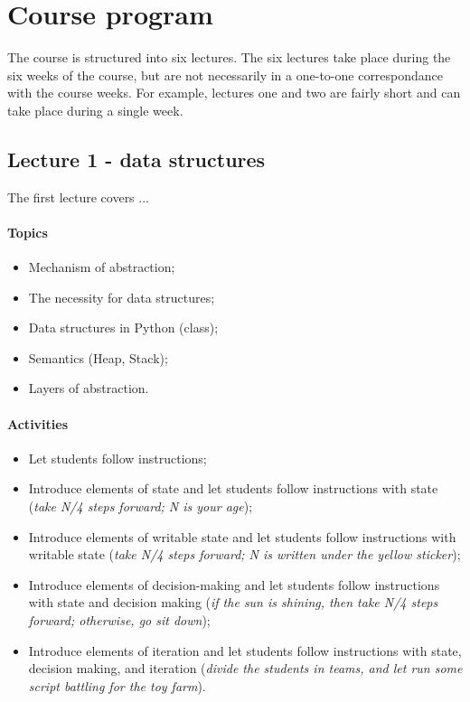 \section{Course program}
	The course is structured into six lectures. The six lectures take place during the six weeks of the course, but are not necessarily in a one-to-one correspondance with the course weeks. For example, lectures one and two are fairly short and can take place during a single week.

	\subsection{Lecture 1 - data structures}
		The first lecture covers ...

		\paragraph*{Topics}
			\begin{itemize}
				\item Mechanism of abstraction;
				\item The necessity for data structures;
				\item Data structures in Python (class);
				\item Semantics (Heap, Stack);
				\item Layers of abstraction.
			\end{itemize}

		\paragraph*{Activities}
			\begin{itemize}
				\item Let students follow instructions;
				\item Introduce elements of state and let students follow instructions with state (\textit{take N/4 steps forward; N is your age});
				\item Introduce elements of writable state and let students follow instructions with writable state (\textit{take N/4 steps forward; N is written under the yellow sticker});
				\item Introduce elements of decision-making and let students follow instructions with state and decision making (\textit{if the sun is shining, then take N/4 steps forward; otherwise, go sit down});
				\item Introduce elements of iteration and let students follow instructions with state, decision making, and iteration (\textit{divide the students in teams, and let run some script battling for the toy farm}).
			\end{itemize}

